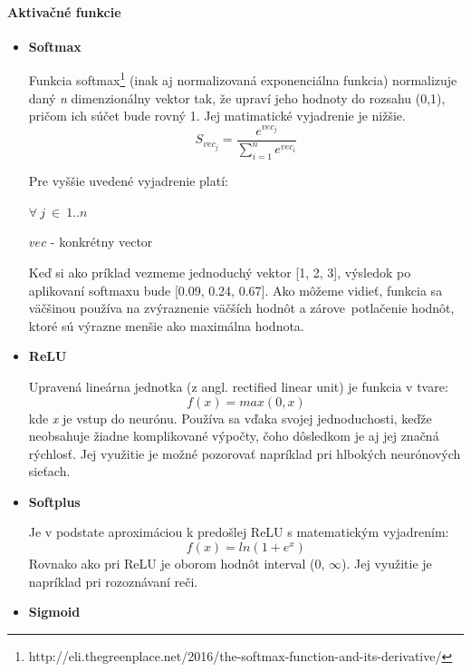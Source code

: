 	\paragraph{Aktivačné funkcie}
	\begin{itemize}
		\item {\textbf{Softmax}}
		
		Funkcia softmax\footnote{http://eli.thegreenplace.net/2016/the-softmax-function-and-its-derivative/} (inak aj normalizovaná exponenciálna funkcia) normalizuje daný  \textit{n} dimenzionálny vektor tak, že upraví jeho hodnoty do rozsahu (0,1), pričom ich súčet bude rovný 1. Jej matimatické vyjadrenie je nižšie. 
		\begin{equation}
		S_{vec_j} = \frac{e^{vec_j}}{\sum_{i=1}^{n}e^{vec_i}}
		\end{equation}
		
		Pre vyššie uvedené vyjadrenie platí:
		
		\(\forall{\ j\ }\in\ 1..n\)
		
		\(vec \) - konkrétny vector
		
		Keď si ako príklad vezmeme jednoduchý vektor [1, 2, 3], výsledok po aplikovaní softmaxu bude [0.09, 0.24, 0.67]. Ako môžeme vidieť, funkcia sa väčšinou používa na zvýraznenie väčších hodnôt a zárove\ potlačenie hodnôt, ktoré sú výrazne menšie ako maximálna hodnota. 
		
		\item {\textbf{ReLU}}
		
		Upravená lineárna jednotka (z angl. rectified linear unit) je funkcia 
		v tvare:
		\begin{equation}
		f(x) = max (0, x)
		\end{equation}
		kde \textit{x} je vstup do neurónu. Používa sa vďaka svojej jednoduchosti, keďže neobsahuje žiadne komplikované výpočty, čoho dôsledkom je aj jej značná rýchlosť. Jej využitie je možné pozorovať napríklad pri hlbokých neurónových sieťach.
		
		\item{\textbf{Softplus}}
		
		Je v podstate aproximáciou k predošlej ReLU s matematickým vyjadrením:
		\begin{equation}
		f(x)=ln (1 + e^x)
		\end{equation}
		Rovnako ako pri ReLU je oborom hodnôt interval (0, \(\infty\)). Jej využitie je napríklad pri rozoznávaní reči.
		
		\item{\textbf{Sigmoid}}
		

\end{itemize}
